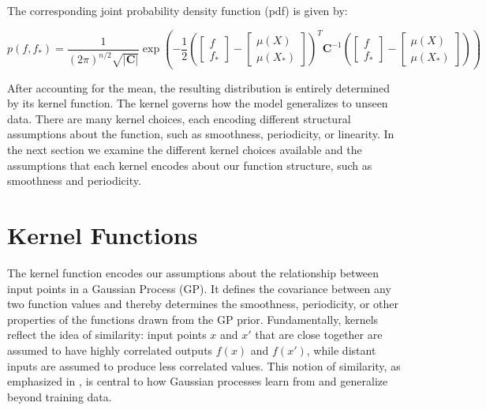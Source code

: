 \documentclass{ucdgradtaughtthesis}
\begin{document}
\noindent
The corresponding joint probability density function (pdf) is given by:

\begin{equation}
    p(f, f_*) = \frac{1}{(2\pi)^{n/2} \sqrt{|\mathbf{C}|}} \exp\left( 
    - \frac{1}{2}\left(\begin{bmatrix}f \\f_*\end{bmatrix}-
    \begin{bmatrix}\mu(X) \\\mu(X_*)\end{bmatrix}\right)^T
    \mathbf{C}^{-1}\left(
    \begin{bmatrix}f \\f_*\end{bmatrix}-
    \begin{bmatrix}\mu(X) \\\mu(X_*)\end{bmatrix}\right)\right)
\end{equation}
    

\noindent
After accounting for the mean, the resulting distribution is entirely determined by its kernel function.
The kernel governs how the model generalizes to unseen data. There are many kernel choices, each encoding different structural assumptions about the function, such as smoothness, periodicity, or linearity.
In the next section we examine the different kernel choices available and the assumptions that each kernel encodes about our function structure, such as smoothness and periodicity.



\section{Kernel Functions}
\label{sec: Kernels}
The kernel function encodes our assumptions about the relationship between input points in a Gaussian Process (GP).
It defines the covariance between any two function values and thereby determines the smoothness, periodicity, or other properties of the functions drawn from the GP prior.
Fundamentally, kernels reflect the idea of similarity: input points \( x \) and \( x' \) that are close together are assumed to have highly correlated outputs \( f(x) \) and \( f(x') \),
while distant inputs are assumed to produce less correlated values. This notion of similarity, as emphasized in \cite[p.~79]{bible}, is central to how Gaussian processes learn from and generalize beyond training data.
\end{document}
